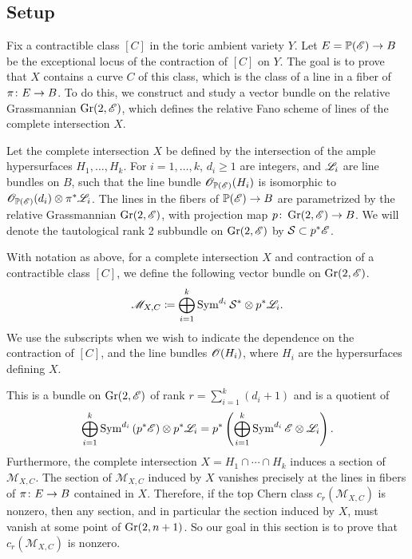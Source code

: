 

\subsection{Setup}
Fix a contractible class $[C]$ in the toric ambient variety $Y$. Let $E = \mathbb{P}(\mathscr{E}) \to B$ be the exceptional locus of the contraction of $[C]$ on $Y$. The goal is to prove that $X$ contains a curve $C$ of this class, which is the class of a line in a fiber of $\pi \colon E \to B$. To do this, we construct and study a vector bundle on the relative Grassmannian $\operatorname{Gr}(2,\mathscr{E})$, which defines the relative Fano scheme of lines of the complete intersection $X$.  

Let the complete intersection $X$ be defined by the intersection of the ample hypersurfaces $H_1, \dots, H_k$. For $i= 1,\dots,k$, $d_i \geq 1$ are integers, and $\mathscr{L}_i$ are line bundles on $B$, such that the line bundle $\mathscr{O}_{\mathbb{P}(\mathscr{E})}(H_i)$ is isomorphic to $\mathscr{O}_{\mathbb{P}(\mathscr{E})}(d_i) \otimes \pi^*\mathscr{L}_i$. The lines in the fibers of $\mathbb{P}(\mathscr{E}) \to B$ are parametrized by the relative Grassmannian $\operatorname{Gr}(2,\mathscr{E})$, with projection map $p \colon \operatorname{Gr}(2,\mathscr{E}) \to B$. We will denote the tautological rank 2 subbundle on $\operatorname{Gr}(2,\mathscr{E})$ by $\mathcal{S} \subset p^*\mathscr{E}$.

\begin{definition}
\label{def:MDefinition}
With notation as above, for a complete intersection $X$ and contraction of a contractible class $[C]$, we define the following vector bundle on $\operatorname{Gr}(2,\mathscr{E})$.
\begin{equation}
  \label{eq:MDefinition}
  \mathscr{M}_{X,C} \coloneqq \bigoplus_{i=1}^k \operatorname{Sym}^{d_i} \mathcal{S}^* \otimes p^*\mathscr{L}_i.
\end{equation}
We use the subscripts when we wish to indicate the dependence on the contraction of $[C]$, and the line bundles $\mathscr{O}(H_i)$, where $H_i$ are the hypersurfaces defining $X$.
\end{definition}

This is a bundle on $\operatorname{Gr}(2,\mathscr{E})$ of rank $r = \sum_{i=1}^k (d_i+1)$ and is a quotient of
\[\bigoplus_{i=1}^k \operatorname{Sym}^{d_i}\left(p^*\mathscr{E} \right) \otimes p^*\mathscr{L}_i = p^* \left(\bigoplus_{i=1}^k \operatorname{Sym}^{d_i}\mathscr{E} \otimes \mathscr{L}_i \right). \]
Furthermore, the complete intersection $X = H_1 \cap \cdots \cap H_k$ induces a section of $\mathscr{M}_{X,C}$. The section of $\mathscr{M}_{X,C}$ induced by $X$ vanishes precisely at the lines in fibers of $\pi \colon E \to B$ contained in $X$. Therefore, if the top Chern class $c_r(\mathscr{M}_{X,C})$ is nonzero, then any section, and in particular the section induced by $X$, must vanish at some point of $\operatorname{Gr}(2,n+1)$. So our goal in this section is to prove that $c_r(\mathscr{M}_{X,C})$ is nonzero.

